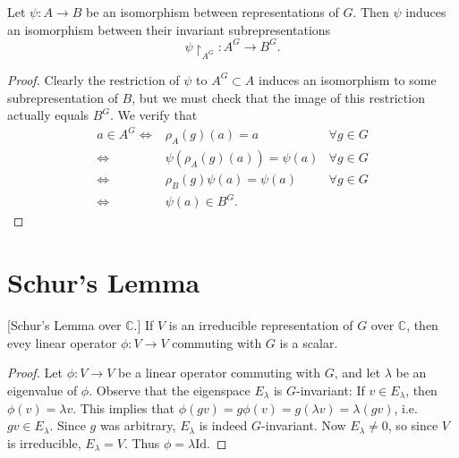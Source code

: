\begin{lemma}\label{isomorphism-invariant-subrprns}
Let $\psi \colon A \to B$ be an isomorphism between representations of $G$. Then $\psi$ induces an isomorphism between their invariant subrepresentations 
\[ \psi \restriction_{A^G} \colon A^G \to B^G.\]
\end{lemma}
\begin{proof}
Clearly the restriction of $\psi$ to $A^G \subset A$ induces an isomorphism to some subrepresentation of $B$, but we must check that the image of this restriction actually equals $B^G$.  We verify that 
\begin{align*}
a \in A^G \iff & \rho_A (g) (a) = a & \forall g \in G \\
\iff & \psi( \rho_A (g)(a)) = \psi (a) & \forall g \in G \\
\iff & \rho_B(g) \psi(a) = \psi(a) & \forall g \in G \\
\iff & \psi(a) \in B^G.
\end{align*}
\end{proof}

\section{Schur's Lemma}
\begin{thm}\label{schur-lemma-over-c}[Schur's Lemma over $\mathbb{C}$.] If $V$ is an irreducible representation of $G$ over $\mathbb{C}$, then evey linear operator $\phi \colon V \to V$ commuting with $G$ is a scalar.
\end{thm}
\begin{proof}
Let $\phi \colon V \to V$  be a linear operator commuting with $G$, and let $\lambda$ be an eigenvalue of $\phi$.  Observe that the eigenspace $E_\lambda$ is $G$-invariant: If $v \in E_\lambda$, then $\phi(v) = \lambda v$.  This implies that $\phi(g v) = g \phi(v) = g (\lambda v) = \lambda (gv)$, i.e. $gv \in E_\lambda$. Since $g$ was arbitrary, $E_\lambda$ is indeed $G$-invariant.  Now $E_\lambda \neq 0$, so since $V$ is irreducible, $E_\lambda = V$.  Thus $\phi = \lambda \text{Id}$.  
\end{proof}

